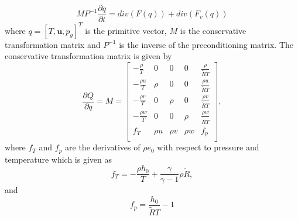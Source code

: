 \begin{equation}
  M P^{-1} \frac{\partial q}{\partial t} = div(F(q)) + div(F_v(q))
\end{equation}
where $q=[T, \mathbf{u}, p_g]^T$ is the primitive vector, $M$ is the conservative transformation matrix and $P^{-1}$ is the inverse of the preconditioning matrix.  The conservative transformation matrix is given by
\begin{equation}
\frac{\partial Q}{\partial q} = M=\left[
{\begin{array}{cccccc}
-\frac{\rho}{T}   & 0    & 0 & 0 & \frac{\rho}{\tilde{R} T}  \\
-\frac{\rho u}{T} & \rho & 0 & 0 & \frac{\rho u}{\tilde{R} T} \\
-\frac{\rho v}{T} & 0 & \rho & 0 & \frac{\rho v}{\tilde{R} T} \\
-\frac{\rho w}{T} & 0& 0 & \rho  & \frac{\rho w}{\tilde{R} T} \\
f_T & \rho u & \rho v & \rho w & f_p\\
\end{array}}
\right],
\end{equation}
where $f_T$ and $f_p$ are the derivatives of $\rho e_0$ with respect to pressure and temperature which is given as
\begin{equation}
f_T= -\frac{\rho h_0}{T} + \frac{\gamma}{\gamma-1} \rho \tilde{R},
\end{equation}
and
\begin{equation}
f_p= \frac{h_0}{\tilde{R} T} - 1 
\end{equation}

